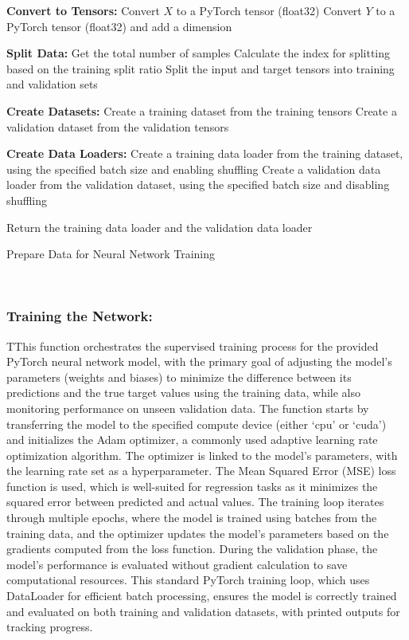 \documentclass{article}
\begin{document}
\begin{algorithm}[H]
\SetAlgoLined %

\textbf{Convert to Tensors:}\;
Convert \(X\) to a PyTorch tensor (float32)\;
Convert \(Y\) to a PyTorch tensor (float32) and add a dimension\;

\textbf{Split Data:}\;
Get the total number of samples\;
Calculate the index for splitting based on the training split ratio\;
Split the input and target tensors into training and validation sets\;

\textbf{Create Datasets:}\;
Create a training dataset from the training tensors\;
Create a validation dataset from the validation tensors\;

\textbf{Create Data Loaders:}\;
Create a training data loader from the training dataset, using the specified batch size and enabling shuffling\;
Create a validation data loader from the validation dataset, using the specified batch size and disabling shuffling\;

Return the training data loader and the validation data loader\;

\caption{Prepare Data for Neural Network Training}
\label{alg:prepare_data} %
\end{algorithm}\\





\subsubsection{Training the Network:}

TThis function orchestrates the supervised training process for the provided PyTorch neural network model, with the primary goal of adjusting the model’s parameters (weights and biases) to minimize the difference between its predictions and the true target values using the training data, while also monitoring performance on unseen validation data. The function starts by transferring the model to the specified compute device (either ‘cpu’ or ‘cuda’) and initializes the Adam optimizer, a commonly used adaptive learning rate optimization algorithm. The optimizer is linked to the model's parameters, with the learning rate set as a hyperparameter. The Mean Squared Error (MSE) loss function is used, which is well-suited for regression tasks as it minimizes the squared error between predicted and actual values. The training loop iterates through multiple epochs, where the model is trained using batches from the training data, and the optimizer updates the model’s parameters based on the gradients computed from the loss function. During the validation phase, the model’s performance is evaluated without gradient calculation to save computational resources. This standard PyTorch training loop, which uses DataLoader for efficient batch processing, ensures the model is correctly trained and evaluated on both training and validation datasets, with printed outputs for tracking progress.\\
\end{document}
